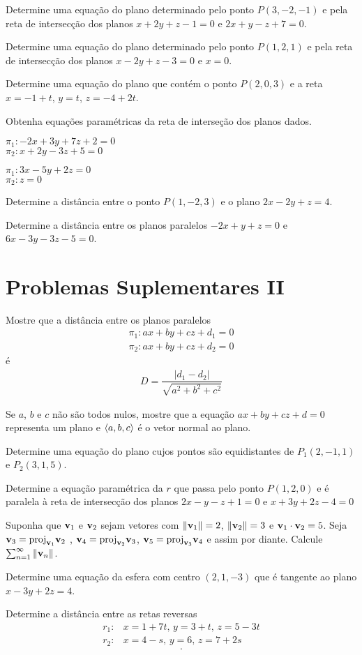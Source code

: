 \item Determine uma equação do plano determinado pelo ponto $P(3,-2,-1)$ e pela reta de intersecção dos planos
            $x+2y+z-1=0$ e   $2x+y-z+7=0$.
\item  Determine uma equação do plano determinado pelo ponto $P(1,2,1)$ e pela reta de intersecção dos planos $x-2y+z-3=0$ e $x=0$.

\item Determine uma equação do plano que contém o ponto $P(2, 0, 3)$ e a reta $x = -1 + t$, $y = t$, $z = -4 + 2t$.

\item[\textcolor{blue}{69-70}] Obtenha equações paramétricas da reta de interseção dos planos dados.

\item $\pi_1: -2x + 3y + 7z + 2 = 0$\\
$\pi_2: x + 2y - 3z + 5 = 0$
\item $\pi_1: 3x - 5y + 2z = 0$\\
$\pi_2: z=0$
\item Determine a distância entre o ponto $P(1, -2, 3)$ e o plano $2x - 2y + z = 4$.
\item Determine a distância entre os planos paralelos $-2x + y + z = 0$ e $6x - 3y - 3z - 5 = 0$.

\section{Problemas Suplementares II}
\item Mostre que a distância entre os planos paralelos 
\begin{align*}
    \pi_1: ax+by+cz + d_1=0\\
    \pi_2: ax+by+cz + d_2=0
\end{align*}
é 
\begin{align*}
    D=\dfrac{|d_1-d_2|}{\sqrt{a^2+b^2+ c^2}}
\end{align*}
\item Se $a$, $b$ e $c$ não são todos nulos, mostre que a equação $ax + by + cz+ d = 0$ representa um plano e $\langle a, b, c\rangle$ é o vetor normal ao plano.

\item Determine uma equação do plano cujos pontos são equidistantes de $P_1(2, -1, 1)$ e $P_2(3, 1, 5)$.

\item Determine a equação paramétrica da $r$ que passa pelo ponto $P(1,2,0)$ e é paralela à reta de intersecção dos planos $2x-y-z+1=0$ e $x+3y+2z-4=0$
\item Suponha que $\mathbf{v}_1$ e $\mathbf{v}_2$ sejam vetores com $\|\mathbf{v}_1\| = 2$, $\| \mathbf{v}_2\| = 3$ e $\mathbf{v}_1 \cdot \mathbf{v}_2 = 5$. Seja $\mathbf{v}_3 = \mathrm{proj}_{\mathbf{v}_1} \mathbf{v}_2$ , $\mathbf{v}_4 = \mathrm{proj}_{\mathbf{v}_2} \mathbf{v}_3$, $\mathbf{v}_5 = \mathrm{proj}_{\mathbf{v}_3} \mathbf{v}_4$  e assim por diante. Calcule $\sum_{n=1}^{\infty}\|\mathbf{v}_n \|$.
\item Determine uma equação da esfera com centro $(2, 1, -3)$ que é tangente ao plano $x - 3y + 2z = 4$.

\item Determine a distância entre as retas reversas 
\begin{align*}
    r_1: & x = 1 + 7t, \, y = 3 + t, \, z = 5 - 3t\\
    r_2: & x = 4 - s,\, y = 6,\, z = 7 + 2s
\end{align*}
$$.$$
